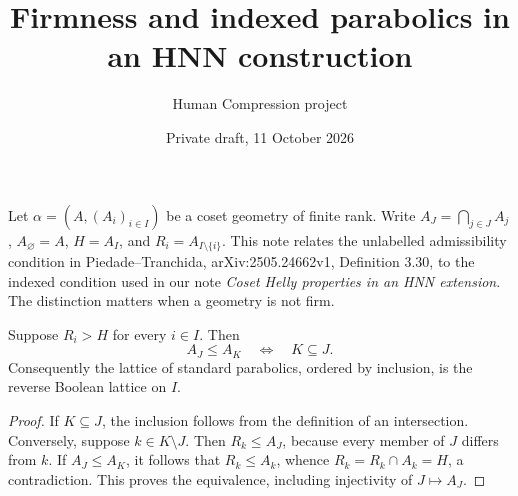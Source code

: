 
\title{Firmness and indexed parabolics in an HNN construction}
\author{Human Compression project}
\date{Private draft, 11 October 2026}

\maketitle

Let $\alpha=(A,(A_i)_{i\in I})$ be a coset geometry of finite rank.
Write $A_J=\bigcap_{j\in J}A_j$, $A_\varnothing=A$,
$H=A_I$, and $R_i=A_{I\setminus\{i\}}$.
This note relates the unlabelled admissibility condition in
Piedade--Tranchida, arXiv:2505.24662v1, Definition 3.30, to the indexed
condition used in our note \emph{Coset Helly properties in an HNN extension}.
The distinction matters when a geometry is not firm.

\begin{lemma}\label{lem:boolean}
Suppose $R_i>H$ for every $i\in I$. Then
\[
 A_J\leq A_K\quad\Longleftrightarrow\quad K\subseteq J.
\]
Consequently the lattice of standard parabolics, ordered by inclusion,
is the reverse Boolean lattice on $I$.
\end{lemma}
\begin{proof}
If $K\subseteq J$, the inclusion follows from the definition of an
intersection. Conversely, suppose $k\in K\setminus J$. Then
$R_k\leq A_J$, because every member of $J$ differs from $k$.
If $A_J\leq A_K$, it follows that $R_k\leq A_k$, whence
$R_k=R_k\cap A_k=H$, a contradiction. This proves the equivalence,
including injectivity of $J\mapsto A_J$.
\end{proof}

